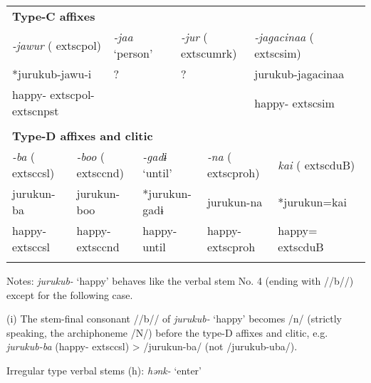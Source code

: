 \begin{tabularx}{\textwidth}{XXXXXXXXXm{}XXXXXXXXX}
\multicolumn{19}{X}{{\bfseries Type-C affixes}}\\
\multicolumn{4}{X}{{ \textit{{}-jawur} (	extsc{pol})}} & \multicolumn{2}{X}{{ \textit{{}-jaa} ‘person’}} & \multicolumn{4}{X}{{ \textit{{}-jur} (	extsc{umrk})}} & \multicolumn{9}{X}{{ \textit{{}-jagacinaa} (	extsc{sim})}}\\
\multicolumn{4}{X}{{ *jurukub-jawu-i}} & \multicolumn{2}{X}{{ ?}} & \multicolumn{4}{X}{?} & \multicolumn{9}{X}{{ jurukub-jagacinaa}}\\
\multicolumn{4}{X}{happy-	extsc{pol}-	extsc{npst}} & \multicolumn{2}{X}{} & \multicolumn{4}{X}{} & \multicolumn{9}{X}{happy-	extsc{sim}}\\
\multicolumn{19}{X}{}\\
\multicolumn{19}{X}{{\bfseries Type-D affixes and clitic}}\\
{ \textit{{}-ba} (	extsc{csl})} & \multicolumn{4}{X}{{ \textit{{}-boo} (	extsc{cnd})}} & \multicolumn{3}{X}{{ \textit{{}-gadɨ} ‘until’}} & \multicolumn{3}{X}{{ \textit{{}-na} (	extsc{proh})}} & \multicolumn{8}{X}{{ \textit{kai} (	extsc{du}B)}}\\
{ jurukun-ba} & \multicolumn{4}{X}{{ jurukun-boo}} & \multicolumn{3}{X}{{ *jurukun-gadɨ}} & \multicolumn{3}{X}{{ jurukun-na}} & \multicolumn{8}{X}{{ *jurukun=kai}}\\
happy-	extsc{csl} & \multicolumn{4}{X}{happy-	extsc{cnd}} & \multicolumn{3}{X}{happy-until} & \multicolumn{3}{X}{happy-	extsc{proh}} & \multicolumn{8}{X}{happy=	extsc{du}B}\\
\lspbottomrule
\end{tabularx}
Notes: \textit{jurukub-} ‘happy’ behaves like the verbal stem No. 4 (ending with //b//) except for the following case.

(i)  The stem-final consonant //b// of \textit{jurukub-} ‘happy’ becomes /n/ (strictly speaking, the archiphoneme /N/) before the type-D affixes and clitic, e.g. \textit{jurukub-ba} (happy-	extsc{csl}) > /jurukun-ba/ (not /jurukub-uba/).

Irregular type verbal stems (h): \textit{hənk-} ‘enter’

\tablefirsthead{}

